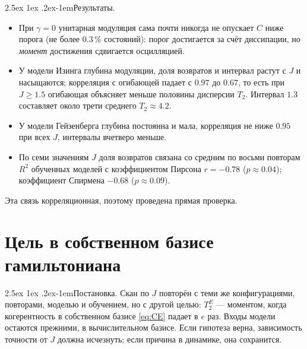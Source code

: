 \documentclass[12pt,a4paper]{report}
\makeatletter
\renewcommand\paragraph{\@startsection{paragraph}{4}{\z@}%
  {2.5ex \@plus1ex \@minus.2ex}{-1em}{\normalfont\normalsize\bfseries}}
\numberwithin{equation}{chapter}
\makeatother
\begin{document}
\paragraph{Результаты.}
\begin{itemize}
\item При $\gamma=0$ унитарная модуляция сама почти никогда не опускает $C$
      ниже порога (не более 0.3\,\% состояний): порог достигается за счёт
      диссипации, но \emph{момент} достижения сдвигается осцилляцией.
\item У модели Изинга глубина модуляции, доля возвратов и интервал растут с
      $J$ и насыщаются; корреляция с огибающей падает с $0.97$ до $0.67$, то
      есть при $J\ge1.5$ огибающая объясняет меньше половины дисперсии $T_2$.
      Интервал $1.3$ составляет около трети среднего $T_2\approx4.2$.
\item У модели Гейзенберга глубина постоянна и мала, корреляция не ниже $0.95$
      при всех $J$, интервалы вчетверо меньше.
\item По семи значениям $J$ доля возвратов связана со средним по восьми
      повторам $R^2$ обученных моделей с коэффициентом Пирсона $r=-0.78$
      ($p\approx0.04$); коэффициент Спирмена $-0.68$ ($p\approx0.09$).
\end{itemize}
Эта связь корреляционная, поэтому проведена прямая проверка.

\section{Цель в собственном базисе гамильтониана}
\label{sec:r10}

\paragraph{Постановка.} Скан по $J$ повторён с теми же конфигурациями,
повторами, моделью и обучением, но с другой целью: $T_2^E$ --- моментом, когда
когерентность в собственном базисе \eqref{eq:CE} падает в $e$ раз. Входы
модели остаются прежними, в вычислительном базисе. Если гипотеза верна,
зависимость точности от $J$ должна исчезнуть; если причина в динамике, она
сохранится.
\end{document}

